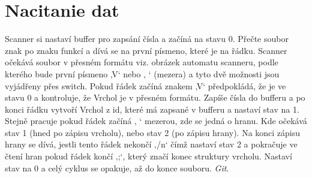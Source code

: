 \section{Nacitanie dat}
Scanner si nastaví buffer pro zapsání čísla a začíná na stavu 0. Přečte soubor znak po znaku funkcí a dívá se na první písmeno, které je na řádku. Scanner očekává soubor v přesném formátu viz. obrázek automatu scanneru, podle kterého bude první písmeno ‚V‘ nebo ‚ ‘ (mezera) a tyto dvě možnosti jsou vyjádřeny přes switch. Pokud řádek začíná znakem ‚V‘ předpokládá, že je ve stavu 0 a kontroluje, že Vrchol je v přesném formátu. Zapíše čísla do bufferu a po konci řádku vytvoří Vrchol z id, které má zapsané v bufferu a nastaví stav na 1. Stejně pracuje pokud řádek začíná ‚ ‘ mezerou, zde se jedná o hranu. Kde očekává stav 1 (hned po zápisu vrcholu), nebo stav 2 (po zápisu hrany). Na konci zápisu hrany se dívá, jestli tento řádek nekončí ‚/n‘ čímž nastaví stav 2 a pokračuje ve čtení hran pokud řádek končí ‚;‘, který značí konec struktury vrcholu. Nastaví stav na 0 a celý cyklus se opakuje, až do konce souboru. \textit{Git}.

\newpage
